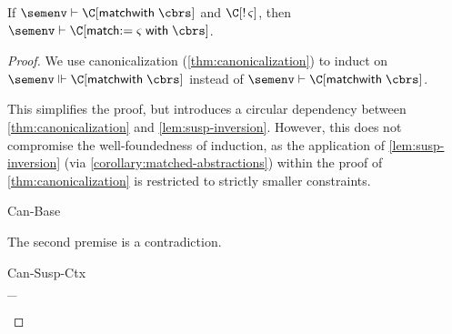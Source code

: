 \documentclass[acmsmall,screen,nonacm,review]{acmart}
\begin{document}
\begin{lemma}
  \label{lem:susp-inversion}
  If $\semenv \th \C\where{\cmatch \t \cbrs}$ and $\Cshape \C \t \sh$,
  then\\$\semenv \th \C\where{\cmatched \t \sh \cbrs}$.

  \begin{proof}
    We use canonicalization (\cref{thm:canonicalization}) to induct on $\semenv \Th
    \C\where{\cmatch \t \cbrs}$ instead of $\semenv \th \C\where{\cmatch \t
    \cbrs}$.

    This simplifies the proof, but introduces a circular dependency between
    \cref{thm:canonicalization} and \cref{lem:susp-inversion}.
    However, this does not compromise the well-foundedness of induction, as the
    application of \cref{lem:susp-inversion} (via
    \cref{corollary:matched-abstractions}) within the proof of
    \cref{thm:canonicalization} is restricted to strictly smaller constraints.

    \begin{proofcases}
      \proofcasederivation
	{Can-Base}
	{\semenv \th \C\where{\cmatch \t \cbrs} \\ \C\where{\cmatch \t \cbrs} \simple}
	{\semenv \Th \C\where{\cmatch \t \cbrs}}

        The second premise is a contradiction.

      \proofcasederivation
	{Can-Susp-Ctx}
	{\Cshape \Cp \tp \shp \\ \semenv \Th \Cp{}}
	{\semenv \Th {}_{\C\where{\cmatch {~\t~} {~\cbrs}}}}

	\begin{llproof}
	  \casesPf{\C = \Cp}
	\end{llproof}
	\begin{proofcases}
	  \proofcase{$\C = \Cp$}

	    \begin{llproof}
	      \eqPf{\C}{\Cp}{Premise}
	      \eqPf{\tp}{\t}{}
	      \eqPf{\shp}{\sh}{}
	      \eqPf{\cbrs'}{\cbrs}{}
\Hand         {}
	    \end{llproof}

	  \proofcase{$\C \neq \Cp$}


\end{proofcases}
\end{proofcases}
\end{proof}
\end{lemma}
\end{document}
